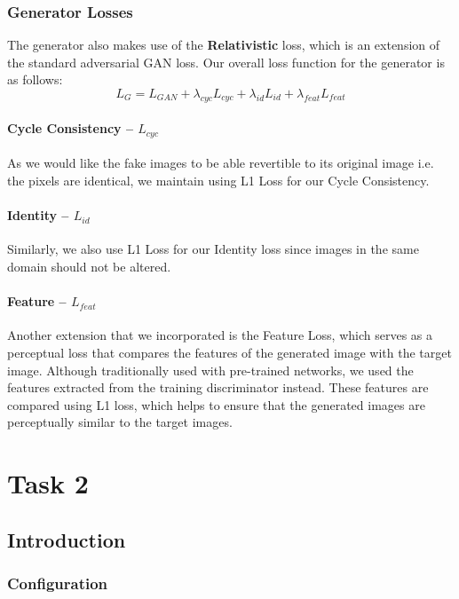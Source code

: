 \documentclass[twoside,english,notitlepage]{report}
\begin{document}
\subsection{Generator Losses}
The generator also makes use of the \textbf{Relativistic} loss, which is an extension of the standard adversarial GAN loss. Our overall loss function for the generator is as follows:
\begin{equation}
    L_{G} = L_{GAN} + \lambda_{cyc} L_{cyc} + \lambda_{id} L_{id} + \lambda_{feat} L_{feat}
\end{equation}
\subsubsection{Cycle Consistency – $L_{cyc}$}
As we would like the fake images to be able revertible to its original image i.e. the pixels are identical, we maintain using L1 Loss for our Cycle Consistency.

\subsubsection{Identity – $L_{id}$}
Similarly, we also use L1 Loss for our Identity loss since images in the same domain should not be altered. 
\subsubsection{Feature – $L_{feat}$}
Another extension that we incorporated is the Feature Loss, which serves as a perceptual loss that compares the features of the generated image with the target image. Although traditionally used with pre-trained networks, we used the features extracted from the training discriminator instead. These features are compared using L1 loss, which helps to ensure that the generated images are perceptually similar to the target images. 

\chapter{Task 2}
\section{Introduction}



\subsection{Configuration}
\end{document}

